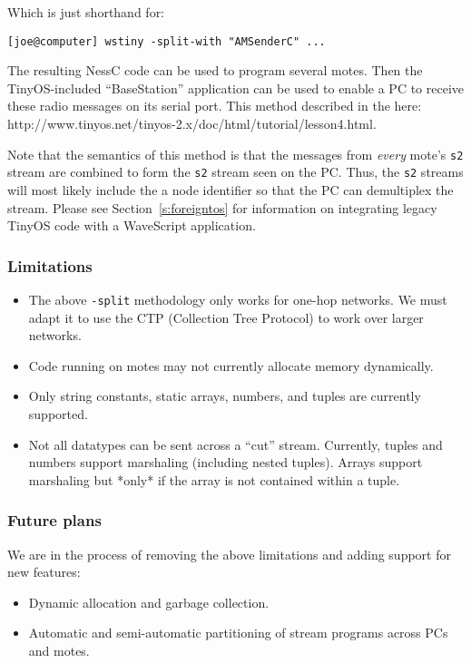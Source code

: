\documentclass[twocolumn]{report}
\newcommand{\cde}{\tt}
\begin{document}
Which is just shorthand for:

\begin{verbatim}
[joe@computer] wstiny -split-with "AMSenderC" ...
\end{verbatim}

The resulting NessC code can be used to program several motes.  Then
the TinyOS-included ``BaseStation'' application can be used to enable
a PC to receive these radio messages on its serial port.  This method
described in the here:  
  {http://www.tinyos.net/tinyos-2.x/doc/html/tutorial/lesson4.html}.

Note that the semantics of this method is that the messages from {\em
  every} mote's {\cde s2} stream are combined to form the {\cde s2}
stream seen on the PC.  Thus, the {\cde s2} streams will most likely
include the a node identifier so that the PC can demultiplex the
stream.  Please see Section~\ref{s:foreigntos} for information on integrating
legacy TinyOS code with a WaveScript application.

\subsubsection*{Limitations}

\begin{itemize}
\item The above {\tt -split} methodology only works for
  one-hop networks.  We must adapt it to use the CTP (Collection
  Tree Protocol) to work over larger networks.
\item Code running on motes may not currently allocate memory
  dynamically.
\item Only string constants, static arrays, numbers, and tuples are
  currently supported.
\item Not all datatypes can be sent across a ``cut'' stream.
  Currently, tuples and numbers support marshaling (including nested
  tuples).  Arrays support marshaling but *only* if the array is not
  contained within a tuple.
\end{itemize}

\subsubsection*{Future plans}

We are in the process of removing the above limitations and adding
support for new features:

\begin{itemize}
\item Dynamic allocation and garbage collection.
\item Automatic and semi-automatic partitioning of stream programs
  across PCs and motes.
\end{itemize}
\end{document}
